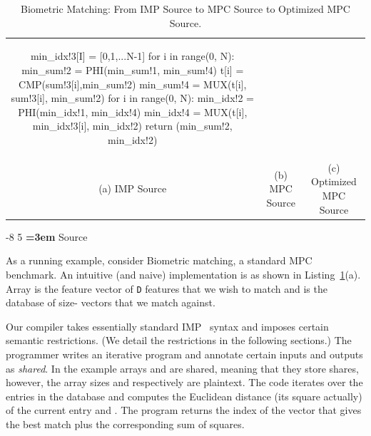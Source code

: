 \documentclass[sigconf, screen, natbib=false, dvipsnames, table]{acmart}
\makeatletter
\renewcommand{\subsection}{\@startsection{subsection}{2}{\z@}%
                        {-8\p@ \@plus -4\p@ \@minus -4\p@}%
                        {5\p@ \@plus 2\p@ \@minus 2\p@}%
                        {\normalfont\Large\bfseries\boldmath
                         \rightskip=\z@ \@plus 3em\pretolerance=10000 }}
\theoremstyle{definition}
\makeatother
\begin{document}
\begin{table}
\begin{tabular}{ccc}
\begin{minipage}{0.33\textwidth}
{\begin{pythonn}
min_idx!3[I] = [0,1,...N-1]   
for i in range(0, N):
   min_sum!2 = PHI(min_sum!1, min_sum!4) 
   t[i] = CMP(sum!3[i],min_sum!2)
   min_sum!4 = MUX(t[i], sum!3[i], min_sum!2)  
for i in range(0, N):
   min_idx!2 = PHI(min_idx!1, min_idx!4)    
   min_idx!4 = MUX(t[i], min_idx!3[i], min_idx!2)
return (min_sum!2, min_idx!2)   
\end{pythonn}
}
\end{minipage}

\\

(a) IMP Source & (b) MPC Source & (c) Optimized MPC Source
\end{tabular}
\caption{Biometric Matching: From IMP Source to MPC Source to Optimized MPC Source. }
\label{tab:source_and_MPC_source_and_optimized_MPC_source}
\end{table}


\subsection{Source}

As a running example, consider Biometric matching, a standard MPC benchmark.
An intuitive (and naive) implementation is as shown in Listing~\ref{tab:source_and_MPC_source_and_optimized_MPC_source}(a).
Array  is the feature vector of \texttt{D} features that we wish to match and  
is the database of  size- vectors that we match against.

Our compiler takes essentially standard IMP~ 
syntax and imposes certain semantic restrictions. (We detail the restrictions in the following sections.)
The programmer writes an iterative program and annotate certain inputs 
and outputs as \emph{shared}. In the example arrays  and 
are shared, meaning that they store shares, however, the array sizes  and
 respectively are plaintext. The code iterates over the entries in the 
database and computes the Euclidean distance (its square actually) of the current 
entry  and . The program returns the index of the vector that gives 
the best match plus the corresponding sum of squares.
\end{document}

